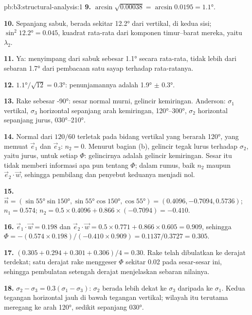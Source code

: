 \begin{solution}{pb:b3:structural-analysis:1}
\textbf{9.} $\arcsin\sqrt{0.00038} = \arcsin0.0195 = \ang{1.1}$.

\textbf{10.} Sepanjang sabuk,  berada sekitar \ang{12.2} dari vertikal,
di kedua sisi; $\sin^2\ang{12.2} = 0.045$, kuadrat rata-rata dari
komponen timur--barat mereka, yaitu $\lambda_2$.

\textbf{11.} Ya:  menyimpang dari sabuk sebesar \ang{1.1} secara rata-rata, tidak
lebih dari sebaran \ang{1.7} dari pembacaan satu sayap terhadap rata-ratanya.

\textbf{12.} $\ang{1.1}/\sqrt{12} = \ang{0.3}$: penunjamannya adalah \ang{1.9} $\pm$
\ang{0.3}.

\textbf{13.} Rake sebesar \ang{-90}: sesar normal murni, gelincir kemiringan. Anderson:
$\sigma_1$ vertikal, $\sigma_3$ horizontal sepanjang arah kemiringan,
\ang{120}--\ang{300}, $\sigma_2$ horizontal sepanjang jurus,
\ang{030}--\ang{210}.

\textbf{14.} Normal dari $120/60$ terletak pada bidang vertikal yang berarah
\ang{120}, yang memuat $\vec e_1$ dan $\vec e_3$: $n_2 = 0$. Menurut bagian (b), gelincir
tegak lurus terhadap $\sigma_2$, yaitu jurus, untuk setiap $\Phi$: gelincirnya adalah
gelincir kemiringan. Sesar itu tidak memberi informasi apa pun tentang $\Phi$; dalam rumus, baik $n_2$ maupun
$\vec e_2\cdot\vec w$, sehingga pembilang dan penyebut keduanya menjadi nol.

\textbf{15.} $\vec n = (\sin\ang{55}\sin\ang{150}, \sin\ang{55}\cos\ang{150},
\cos\ang{55}) = (0.4096, -0.7094, 0.5736)$; $n_1 = 0.574$; $n_2 = 0.5\times
0.4096 + 0.866\times(-0.7094) = -0.410$.

\textbf{16.} $\vec e_1\cdot\vec w = 0.198$ dan $\vec e_2\cdot\vec w = 0.5\times
0.771 + 0.866\times0.605 = 0.909$, sehingga $\Phi = -(0.574\times0.198)/(-0.410\times
0.909) = 0.1137/0.3727 = 0.305$.

\textbf{17.} $(0.305 + 0.294 + 0.301 + 0.306)/4 = 0.30$. Rake telah
dibulatkan ke derajat terdekat; satu derajat rake menggeser $\Phi$ sekitar 0.02 pada
sesar-sesar ini, sehingga pembulatan setengah derajat menjelaskan sebaran nilainya.

\textbf{18.} $\sigma_2 - \sigma_3 = 0.3(\sigma_1 - \sigma_3)$: $\sigma_2$ berada
lebih dekat ke $\sigma_3$ daripada ke $\sigma_1$. Kedua tegangan horizontal jauh
di bawah tegangan vertikal; wilayah itu terutama meregang ke arah \ang{120}, sedikit
sepanjang \ang{030}.


\end{solution}
